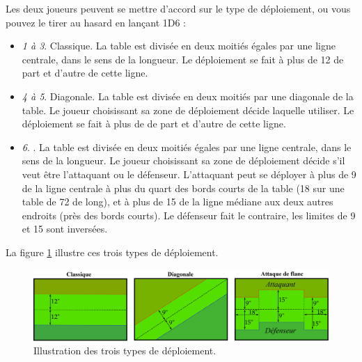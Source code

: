 Les deux joueurs peuvent se mettre d'accord sur le type de déploiement, ou vous pouvez le tirer au hasard en lançant 1D6 :
\begin{itemize}[label={-}]
\item \emph{1 à 3}. Classique. La table est divisée en deux moitiés égales par une ligne centrale, dans le sens de la longueur. Le déploiement se fait à plus de 12{\pouce} de part et d'autre de cette ligne. 
\item \emph{4 à 5}. Diagonale. La table est divisée en deux moitiés par une diagonale de la table. Le joueur choisissant sa zone de déploiement décide laquelle utiliser. Le déploiement se fait à plus de  de part et d'autre de cette ligne. 
\item \emph{6}. . La table est divisée en deux moitiés égales par une ligne centrale, dans le sens de la longueur. Le joueur choisissant sa zone de déploiement décide s'il veut être l'attaquant ou le défenseur. L'attaquant peut se déployer à plus de 9{\pouce} de la ligne centrale à plus du quart des bords courts de la table (18{\pouce} sur une table de 72{\pouce} de long), et à plus de 15{\pouce} de la ligne médiane aux deux autres endroits (près des bords courts). Le défenseur fait le contraire, les limites de 9{\pouce} et 15{\pouce} sont inversées.
\end{itemize}

La figure \ref{figure/deploiement} illustre ces trois types de déploiement.

\begin{figure}[!htbp]
\centering

\includegraphics[width=14cm]{deploiement.png}
\caption{Illustration des trois types de déploiement.}
\label{figure/deploiement}
\end{figure}

\section[Objectifs secondaires]{}

